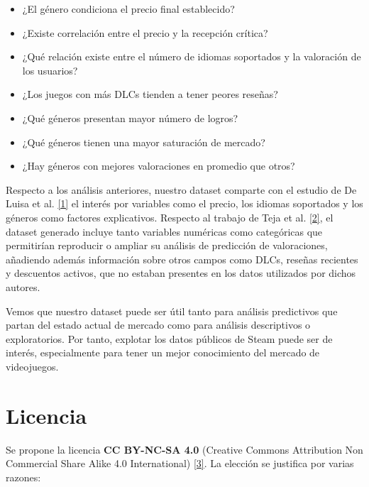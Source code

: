 \documentclass[
]{article}
\begin{document}
\begin{itemize}[itemsep=-4pt]
  \item ¿El género condiciona el precio final establecido?
  \item ¿Existe correlación entre el precio y la recepción crítica?
  \item ¿Qué relación existe entre el número de idiomas soportados y la valoración de los usuarios?
  \item ¿Los juegos con más DLCs tienden a tener peores reseñas?
  \item ¿Qué géneros presentan mayor número de logros?
  \item ¿Qué géneros tienen una mayor saturación de mercado?
  \item ¿Hay géneros con mejores valoraciones en promedio que otros?
\end{itemize}

\vspace{0.2cm}
Respecto a los análisis anteriores, nuestro dataset comparte con el estudio de De Luisa et al. \hyperref[ref:Ref]{[1]} el interés por variables como el precio, los idiomas soportados y los géneros como factores explicativos. Respecto al trabajo de Teja et al. \hyperref[ref:Ref]{[2]}, el dataset generado incluye tanto variables numéricas como categóricas que permitirían reproducir o ampliar su análisis de predicción de valoraciones, añadiendo además información sobre otros campos como DLCs, reseñas recientes y descuentos activos, que no estaban presentes en los datos utilizados por dichos autores.

Vemos que nuestro dataset puede ser útil tanto para análisis predictivos que partan del estado actual de mercado como para análisis descriptivos o exploratorios. Por tanto, explotar los datos públicos de Steam puede ser de interés, especialmente para tener un mejor conocimiento del mercado de videojuegos.

\section{Licencia}\label{licencia}

Se propone la licencia \textbf{CC BY-NC-SA 4.0} (Creative Commons Attribution Non Commercial Share Alike 4.0 International) \hyperref[ref:Ref]{[3]}. La elección se justifica por varias razones:
\end{document}
